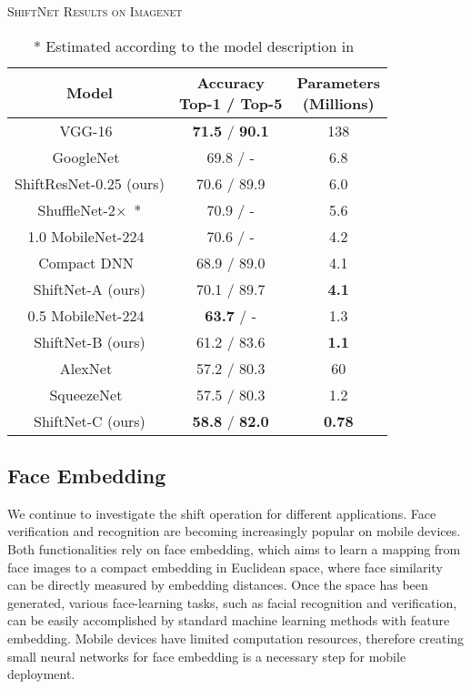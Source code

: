 \documentclass[10pt,twocolumn,letterpaper]{article}
\begin{document}
\begin{table}[]
\centering
\caption{\textsc{ShiftNet Results on Imagenet}}
\label{tab:shiftnet_result}
\begin{tabular}{c|cc}
\hline\hline
Model  & \thead{Accuracy\\ Top-1 / Top-5} & \thead{Parameters \\ (Millions)} \\ \hline
VGG-16~\cite{VGG} & \textbf{71.5} / \textbf{90.1} & 138 \\
GoogleNet~\cite{GoogleNet} & 69.8 / - & 6.8 \\
ShiftResNet-0.25 (ours) & 70.6 / 89.9 & 6.0 \\
ShuffleNet-2$\times$~\cite{ShuffleNet}* & 70.9 / - & 5.6 \\
1.0 MobileNet-224~\cite{MobileNet} & 70.6 / - & 4.2\\
Compact DNN~\cite{compactDNN} & 68.9 / 89.0 & 4.1 \\
ShiftNet-A (ours)  & 70.1 / 89.7 & \textbf{4.1} \\
\hline
0.5 MobileNet-224~\cite{MobileNet} & \textbf{63.7} / - & 1.3\\ 
ShiftNet-B (ours) & 61.2 / 83.6 & \textbf{1.1} \\
\hline
AlexNet~\cite{AlexNet} & 57.2 / 80.3 & 60 \\
SqueezeNet~\cite{SqueezeNet} & 57.5 / 80.3 & 1.2 \\
ShiftNet-C (ours) & \textbf{58.8} / \textbf{82.0} & \textbf{0.78} \\
\hline 
\end{tabular}
    \caption*{* Estimated according to the model description in~\cite{ShuffleNet}}
\vspace{-0.2in}
\end{table}




\subsection{Face Embedding}

We continue to investigate the shift operation for different applications. Face verification and recognition are becoming increasingly popular on mobile devices. Both functionalities rely on face embedding, which aims to learn a mapping from face images to a compact embedding in Euclidean space, where face similarity can be directly measured by embedding distances. Once the space has been generated, various face-learning tasks, such as facial recognition and verification, can be easily accomplished by standard machine learning methods with feature embedding. Mobile devices have limited computation resources, therefore creating small neural networks for face embedding is a necessary step for mobile deployment.
\end{document}
